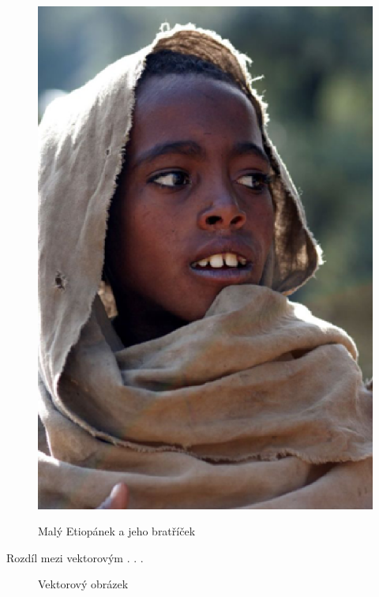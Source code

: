 \documentclass[11pt]{article}
\begin{document}
\begin{figure}[h]
{{            \includegraphics{etiopan.eps}
            }
            }
            \caption{ Malý Etiopánek a jeho bratříček}
    \label{Obr1}
\end{figure}


\newpage
Rozdíl mezi vektorovým . . .
\begin{figure}[h]
    \centering
        \caption{ Vektorový obrázek }
        \label{Obr2}
    \end{figure}
    
\end{document}
